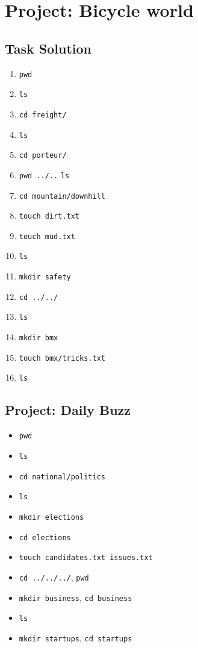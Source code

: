 \documentclass[12pt]{article}
\begin{document}
\section{Project: Bicycle world}
\subsection{Task Solution}
\begin{enumerate}[1.]
    \item \texttt{pwd}
    \item \texttt{ls}
    \item \texttt{cd freight/}
    \item \texttt{ls}
    \item \texttt{cd porteur/}
    \item \texttt{pwd ../..} \texttt{ls}
    \item \texttt{cd mountain/downhill}
    \item \texttt{touch dirt.txt}
    \item \texttt{touch mud.txt}
    \item \texttt{ls}
    \item \texttt{mkdir safety}
    \item \texttt{cd ../../}
    \item \texttt{ls}
    \item \texttt{mkdir bmx}
    \item \texttt{touch bmx/tricks.txt}
    \item \texttt{ls}
\end{enumerate}

\bigskip

\subsection{Project: Daily Buzz}
\begin{itemize}
    \item \texttt{pwd}
    \item \texttt{ls}
    \item \texttt{cd national/politics}
    \item \texttt{ls}
    \item \texttt{mkdir elections}
    \item \texttt{cd elections}
    \item \texttt{touch candidates.txt issues.txt}
    \item \texttt{cd ../../../}, \texttt{pwd}
    \item \texttt{mkdir business}, \texttt{cd business}
    \item \texttt{ls}
    \item \texttt{mkdir startups}, \texttt{cd startups}
\end{itemize}
\end{document}
